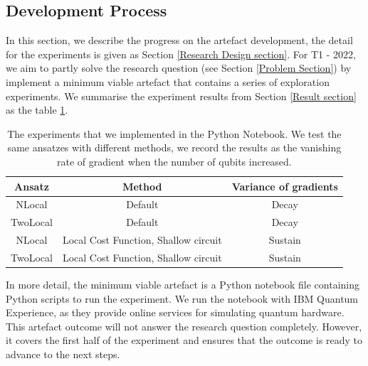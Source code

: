 \subsection{Development Process} \label{Development Process section}

In this section, we describe the progress on the artefact development, the detail for the experiments is given as Section \ref{Research Design section}.
For T1 - 2022, we aim to partly solve the research question (see Section \ref{Problem Section}) by implement a minimum viable artefact that contains a series of exploration experiments.
We summarise the experiment results from Section \ref{Result section} as the table \ref{Experiment summary table}.

\begin{table}
    \centering
    \begin{tabular}{|| c c c ||}
        \hline
        Ansatz   & Method                               & Variance of gradients \\[0.5ex]
        \hline \hline
        NLocal   & Default                              & Decay                 \\
        \hline
        TwoLocal & Default                              & Decay                 \\
        \hline
        NLocal   & Local Cost Function, Shallow circuit & Sustain               \\
        \hline
        TwoLocal & Local Cost Function, Shallow circuit & Sustain               \\
        \hline
    \end{tabular}
    \caption{
        The experiments that we implemented in the Python Notebook. We test the same ansatzes with different methods, we record the results as the vanishing rate of gradient when the number of qubits increased.
    }
    \label{Experiment summary table}
\end{table}

In more detail, the minimum viable artefact is a Python notebook file containing Python scripts to run the experiment.
We run the notebook with IBM Quantum Experience, as they provide online services for simulating quantum hardware.
This artefact outcome will not answer the research question completely.
However, it covers the first half of the experiment and ensures that the outcome is ready to advance to the next steps.

